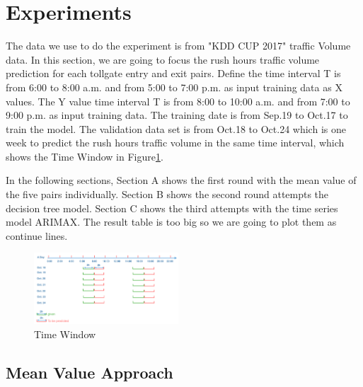 \documentclass[journal, letterpaper]{IEEEtran}
\begin{document}
\section{Experiments}
\large
The data we use to do the experiment is from "KDD CUP 2017" traffic Volume data. In this section, we are going to focus the rush hours traffic volume prediction for each tollgate entry and exit pairs. Define the time interval T is from 6:00 to 8:00 a.m. and from 5:00 to 7:00 p.m. as input training data as X values. The Y value time interval T is from 8:00 to 10:00 a.m. and from 7:00 to 9:00 p.m. as input training data. The training date is from Sep.19 to Oct.17 to train the model. The validation data set is from Oct.18 to Oct.24 which is one week to predict the rush hours traffic volume in the same time interval, which shows the Time Window in Figure\ref{fig:12}. 

In the following sections, Section A shows the first round with the mean value of the five pairs individually. Section B shows the second round attempts the decision tree model. Section C shows the third attempts with the time series model ARIMAX. The result table is too big so we are going to plot them as continue lines.

\begin{figure} [H]
  \centering
  \includegraphics[width=0.48\textwidth]{time-window.png}
  \caption{Time Window}
  \captionsetup{justification=centering}
  \label{fig:12}
\end{figure}

\subsection{Mean Value Approach}
\end{document}
